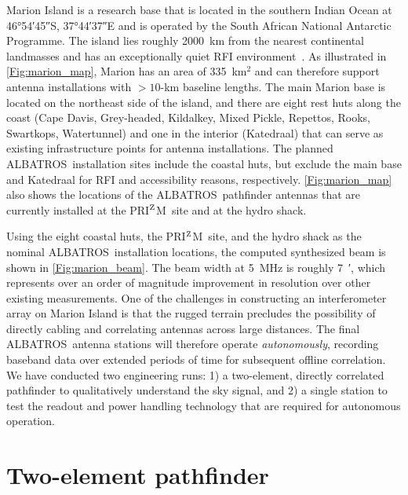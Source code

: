 \documentclass{ws-jai}
\def\albatros{ALBATROS}
\def\prizm{PRI$^{\rm Z}$M}
\begin{document}
Marion Island is a research base that is located in the southern
Indian Ocean at \ang{46;54;45}S, \ang{37;44;37}E and is operated by
the South African National Antarctic Programme.  The island lies
roughly \SI{2000}{\kilo\metre} from the nearest continental landmasses
and has an exceptionally quiet RFI
environment~\citep{2019JAI.....850004P}.  As illustrated in
\autoref{Fig:marion_map}, Marion has an area of 335~km$^2$ and can
therefore support antenna installations with $>10$-km baseline
lengths.  The main Marion base is located on the northeast side of the
island, and there are eight rest huts along the coast (Cape Davis,
Grey-headed, Kildalkey, Mixed Pickle, Repettos, Rooks, Swartkops,
Watertunnel) and one in the interior (Katedraal) that can serve as
existing infrastructure points for antenna installations.  The planned
\albatros\ installation sites include the coastal huts, but exclude
the main base and Katedraal for RFI and accessibility reasons,
respectively.  \autoref{Fig:marion_map} also shows the locations of
the \albatros\ pathfinder antennas that are currently installed at the
\prizm\ site and at the hydro shack.

Using the eight coastal huts, the \prizm\ site, and the hydro shack as
the nominal \albatros\ installation locations, the computed
synthesized beam is shown in \autoref{Fig:marion_beam}.  The beam
width at 5~MHz is roughly \SI{7}{\arcminute}, which represents over an
order of magnitude improvement in resolution over other existing
measurements.  One of the challenges in constructing an interferometer
array on Marion Island is that the rugged terrain precludes the
possibility of directly cabling and correlating antennas across large
distances.  The final \albatros\ antenna stations will therefore
operate {\it autonomously}, recording baseband data over extended
periods of time for subsequent offline correlation.  We have conducted
two engineering runs: 1) a two-element, directly correlated pathfinder
to qualitatively understand the sky signal, and 2) a single station to
test the readout and power handling technology that are required for
autonomous operation.

\section{Two-element pathfinder}\label{s:2elem}
\end{document}
